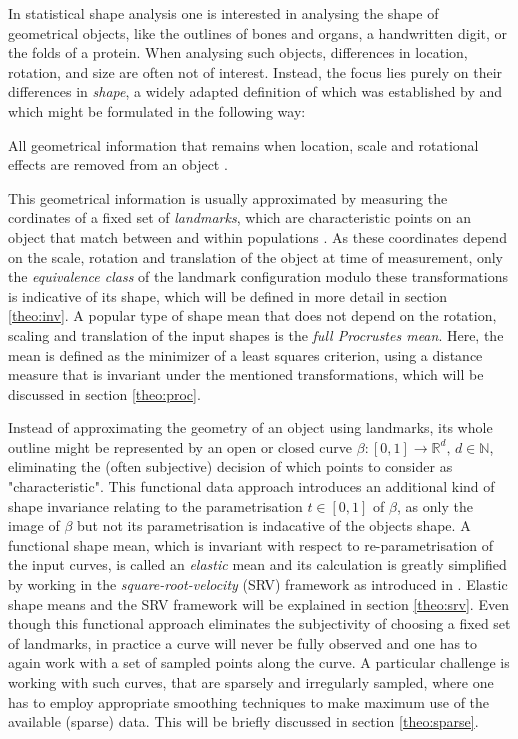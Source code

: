 In statistical shape analysis one is interested in analysing the shape of
geometrical objects, like the outlines of bones and organs, a handwritten
digit, or the folds of a protein.
When analysing such objects, differences in location, rotation, and size
are often not of interest.
Instead, the focus lies purely on their differences in  \textit{shape}, a
widely adapted definition of which was established by \cite{Kendall1977} and which
might be formulated in the following way:
\begin{definition}[Shape] 
    All geometrical information that remains when location, scale
    and rotational effects are removed from an object 
    \parencite[see][1]{DrydenMardia2016}.
\end{definition}
\noindent This geometrical information is usually approximated by measuring
the cordinates of a fixed set of \textit{landmarks}, which are characteristic
points on an object that match between and within populations
\parencite[see][3]{DrydenMardia2016}.
As these coordinates depend on the scale, rotation and translation of the
object at time of measurement, only the \textit{equivalence class} of the
landmark configuration modulo these transformations is indicative of its shape,
which will be defined in more detail in section \ref{theo:inv}.
A popular type of shape mean that does not depend on the rotation, scaling and
translation of the input shapes is the \textit{full Procrustes mean}.
Here, the mean is defined as the minimizer of a least squares criterion, using
a distance measure that is invariant under the mentioned transformations, which
will be discussed in section \ref{theo:proc}.

Instead of approximating the geometry of an object using landmarks, its whole
outline might be represented by an open or closed curve $\beta : [0,1]
\rightarrow \mathbb{R}^d,\, d \in \mathbb{N}$, eliminating the (often
subjective) decision of which points to consider as "characteristic".
This functional data approach introduces an additional kind of shape invariance
relating to the parametrisation $t \in [0,1]$ of $\beta$, as only the image of
$\beta$ but not its parametrisation is indacative of the objects shape.
A functional shape mean, which is invariant with respect to re-parametrisation
of the input curves, is called an \textit{elastic} mean and its calculation is
greatly simplified by working in the \textit{square-root-velocity} (SRV)
framework as introduced in \cite{SrivastavaEtAl2011}.
Elastic shape means and the SRV framework will be explained in section
\ref{theo:srv}.
Even though this functional approach eliminates the subjectivity of choosing a
fixed set of landmarks, in practice a curve will never be fully observed and
one has to again work with a set of sampled points along the curve. 
A particular challenge is working with such curves, that are sparsely and
irregularly sampled, where one has to employ appropriate smoothing techniques
to make maximum use of the available (sparse) data.
This will be briefly discussed in section \ref{theo:sparse}.

